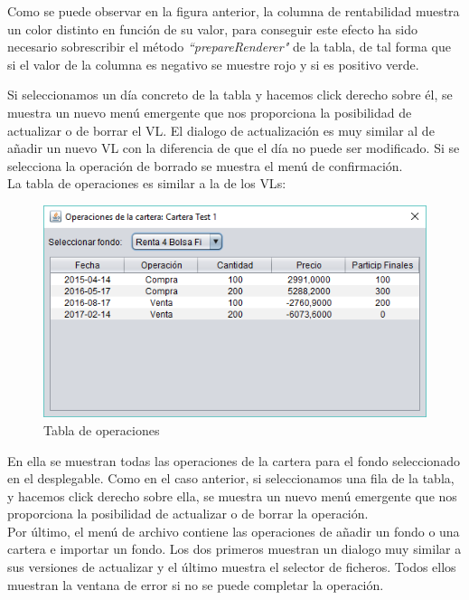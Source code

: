 \documentclass[12pt, a4paper]{article}
\begin{document}
Como se puede observar en la figura anterior, la columna de rentabilidad muestra un color distinto en función de su valor, para conseguir este efecto ha sido necesario sobrescribir el método \textit{``prepareRenderer"} de la tabla, de tal forma que si el valor de la columna es negativo se muestre rojo y si es positivo verde.\\
\newpage

Si seleccionamos un día concreto de la tabla y hacemos click derecho sobre él, se muestra un nuevo menú emergente que nos proporciona la posibilidad de actualizar o de borrar el \gls{VL}. El dialogo de actualización es muy similar al de añadir un nuevo \gls{VL} con la diferencia de que el día no puede ser modificado. Si se selecciona la operación de borrado se muestra el menú de confirmación. 
\\

La tabla de operaciones es similar a la de los \gls{VL}s:

	\begin{figure}[htbp]
	\centering
	\includegraphics[width=12cm]{figuras/ops.PNG}
	\caption{Tabla de operaciones}
	\label{fig:ops}
	\end {figure}

En ella se muestran todas las operaciones de la cartera para el fondo seleccionado en el desplegable. Como en el caso anterior, si seleccionamos una fila de la tabla, y hacemos click derecho sobre ella, se muestra un nuevo menú emergente que nos proporciona la posibilidad de actualizar o de borrar la operación.
\\

Por último, el menú de archivo contiene las operaciones de añadir un fondo o una cartera e importar un fondo. Los dos primeros muestran un dialogo muy similar a sus versiones de actualizar y el último muestra el selector de ficheros. Todos ellos muestran la ventana de error si no se puede completar la operación.
\newpage
\end{document}
